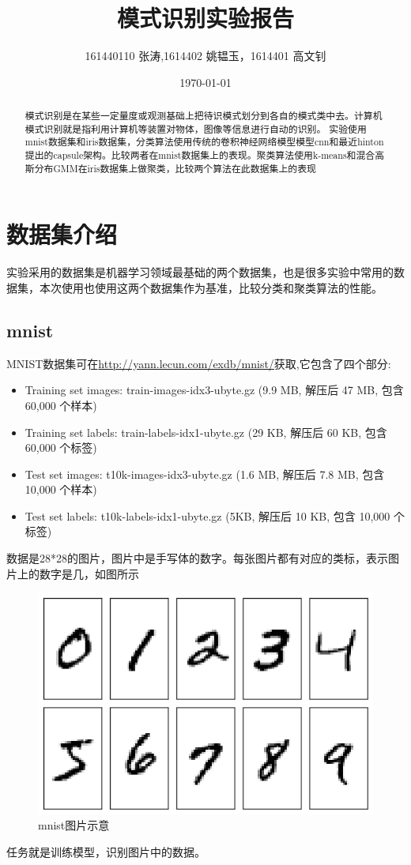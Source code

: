 \documentclass{article}
\title{\textbf{\zihao{2}模式识别实验报告\\ }}
\author{161440110 张涛,1614402 姚韫玉，1614401 高文钊}
\date{\today}
\begin{document}

\maketitle
\begin{abstract}
模式识别是在某些一定量度或观测基础上把待识模式划分到各自的模式类中去。计算机模式识别就是指利用计算机等装置对物体，图像等信息进行自动的识别。
实验使用mnist数据集\cite{mnist}和iris\cite{iris}数据集，分类算法使用传统的卷积神经网络模型模型cnn\cite{lecun1998gradient}和最近hinton提出的capsule架构\cite{sabour2017dynamic}。比较两者在mnist数据集上的表现。聚类算法使用k-means\cite{hartigan1979algorithm}和混合高斯分布GMM\cite{reynolds2015gaussian}在iris数据集上做聚类，比较两个算法在此数据集上的表现
\end{abstract}
\section{数据集介绍}
实验采用的数据集是机器学习领域最基础的两个数据集，也是很多实验中常用的数据集，本次使用也使用这两个数据集作为基准，比较分类和聚类算法的性能。
\subsection{mnist\cite{mnist}}
MNIST数据集可在\url{http://yann.lecun.com/exdb/mnist/}获取,它包含了四个部分:
\begin{itemize}
	\item Training set images: train-images-idx3-ubyte.gz (9.9 MB, 解压后 47 MB, 包含 60,000 个样本)
    \item Training set labels: train-labels-idx1-ubyte.gz (29 KB, 解压后 60 KB, 包含 60,000 个标签)
    \item Test set images: t10k-images-idx3-ubyte.gz (1.6 MB, 解压后 7.8 MB, 包含 10,000 个样本)
    \item Test set labels: t10k-labels-idx1-ubyte.gz (5KB, 解压后 10 KB, 包含 10,000 个标签)
\end{itemize}

数据是28*28的图片，图片中是手写体的数字。每张图片都有对应的类标，表示图片上的数字是几，如图所示
\begin{figure}[htbp]
\centering\includegraphics[scale=0.28]{mnist}
\caption{mnist图片示意}\label{fig:1}
\end{figure}
任务就是训练模型，识别图片中的数据。
\end{document}

